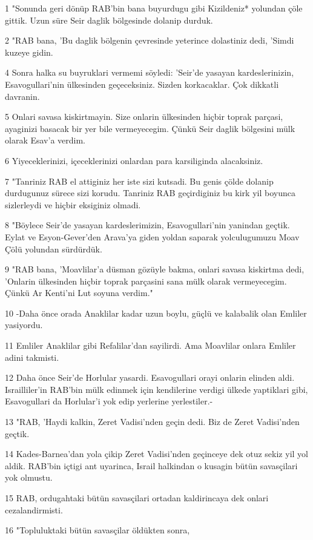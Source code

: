 \par 1 "Sonunda geri dönüp RAB'bin bana buyurdugu gibi Kizildeniz* yolundan çöle gittik. Uzun süre Seir daglik bölgesinde dolanip durduk.
\par 2 "RAB bana, 'Bu daglik bölgenin çevresinde yeterince dolastiniz dedi, 'Simdi kuzeye gidin.
\par 4 Sonra halka su buyruklari vermemi söyledi: 'Seir'de yasayan kardeslerinizin, Esavogullari'nin ülkesinden geçeceksiniz. Sizden korkacaklar. Çok dikkatli davranin.
\par 5 Onlari savasa kiskirtmayin. Size onlarin ülkesinden hiçbir toprak parçasi, ayaginizi basacak bir yer bile vermeyecegim. Çünkü Seir daglik bölgesini mülk olarak Esav'a verdim.
\par 6 Yiyeceklerinizi, içeceklerinizi onlardan para karsiliginda alacaksiniz.
\par 7 "Tanriniz RAB el attiginiz her iste sizi kutsadi. Bu genis çölde dolanip durdugunuz sürece sizi korudu. Tanriniz RAB geçirdiginiz bu kirk yil boyunca sizlerleydi ve hiçbir eksiginiz olmadi.
\par 8 "Böylece Seir'de yasayan kardeslerimizin, Esavogullari'nin yanindan geçtik. Eylat ve Esyon-Gever'den Arava'ya giden yoldan saparak yolculugumuzu Moav Çölü yolundan sürdürdük.
\par 9 "RAB bana, 'Moavlilar'a düsman gözüyle bakma, onlari savasa kiskirtma dedi, 'Onlarin ülkesinden hiçbir toprak parçasini sana mülk olarak vermeyecegim. Çünkü Ar Kenti'ni Lut soyuna verdim."
\par 10 -Daha önce orada Anaklilar kadar uzun boylu, güçlü ve kalabalik olan Emliler yasiyordu.
\par 11 Emliler Anaklilar gibi Refalilar'dan sayilirdi. Ama Moavlilar onlara Emliler adini takmisti.
\par 12 Daha önce Seir'de Horlular yasardi. Esavogullari orayi onlarin elinden aldi. Israilliler'in RAB'bin mülk edinmek için kendilerine verdigi ülkede yaptiklari gibi, Esavogullari da Horlular'i yok edip yerlerine yerlestiler.-
\par 13 "RAB, 'Haydi kalkin, Zeret Vadisi'nden geçin dedi. Biz de Zeret Vadisi'nden geçtik.
\par 14 Kades-Barnea'dan yola çikip Zeret Vadisi'nden geçinceye dek otuz sekiz yil yol aldik. RAB'bin içtigi ant uyarinca, Israil halkindan o kusagin bütün savasçilari yok olmustu.
\par 15 RAB, ordugahtaki bütün savasçilari ortadan kaldirincaya dek onlari cezalandirmisti.
\par 16 "Topluluktaki bütün savasçilar öldükten sonra,
